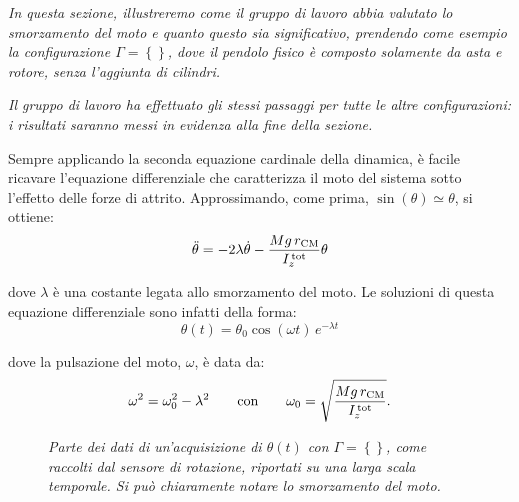 \documentclass{article}
\begin{document}
\emph{
  In questa sezione, illustreremo come il gruppo di lavoro abbia
  valutato lo smorzamento del moto e quanto questo sia significativo,
  prendendo come esempio la configurazione $\Gamma=\left\{\right\}$,
  dove il pendolo fisico è composto solamente da asta e rotore, senza
  l'aggiunta di cilindri.
}

\emph{
  Il gruppo di lavoro ha effettuato gli stessi passaggi per tutte le
  altre configurazioni: i risultati saranno messi in evidenza alla
  fine della sezione.
}
\vspace{2mm}

Sempre applicando la seconda equazione cardinale della dinamica,
è facile ricavare l'equazione differenziale che caratterizza il moto
del sistema sotto l'effetto delle forze di attrito.
Approssimando, come prima, $\sin(\theta)\simeq\theta$, si ottiene:
\[ \ddot{\theta} = -2\lambda\dot{\theta} -\frac{Mg\,r_\text{CM}}{I_z^\text{\,tot}} \theta \]

dove $\lambda$ è una costante legata allo smorzamento del moto.
Le soluzioni di questa equazione differenziale sono infatti della forma:
\[\theta(t) = \theta_0\cos(\omega t)\,e^{-\lambda t}\]

dove la pulsazione del moto, $\omega$, è data da:
\[
  \omega^2 = \omega_0^2 - \lambda^2
  \qquad\text{con}\qquad
  \omega_0 = \sqrt{\frac{Mg\,r_\text{CM}}{I_z^\text{\,tot}}}.
\]

\begin{center}
  \begin{figure}[H]
    \caption[]{\emph{
      Parte dei dati di un'acquisizione di $\theta(t)$
      con $\Gamma=\left\{\right\}$,
      come raccolti dal sensore di rotazione,
      riportati su una larga scala temporale.
      Si può chiaramente notare lo smorzamento
      del moto.
    }}
  \end{figure}
\end{center}
\end{document}
